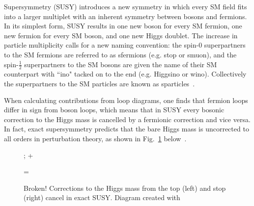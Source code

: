 \documentclass[12pt]{article}
\begin{document}
    Supersymmetry (SUSY) introduces a new symmetry in which every SM field fits into a larger multiplet with an inherent symmetry between bosons and fermions. In its simplest form, SUSY results in one new boson for every SM fermion, one new fermion for every SM boson, and one new Higgs doublet. The increase in particle multiplicity calls for a new naming convention: the spin-0 superpartners to the SM fermions are referred to as sfermions (e.g. stop or smuon), and the spin-$\frac{1}{2}$ superpartners to the SM bosons are given the name of their SM counterpart with ``ino" tacked on to the end (e.g. Higgsino or wino). Collectively the superpartners to the SM particles are known as sparticles~\cite{primer}.

    When calculating contributions from loop diagrams, one finds that fermion loops differ in sign from boson loops, which means that in SUSY every bosonic correction to the Higgs mass is cancelled by a fermionic correction and vice versa. In fact, exact supersymmetry predicts that the bare Higgs mass is uncorrected to all orders in perturbation theory, as shown in Fig.~\ref{exact_susy_correction} below~\cite{primer}.
    
    \noindent \begin{figure}[htbp] \begin{center}
        ;
    \quad + \quad
    \quad =  \quad
        \caption{Broken! Corrections to the Higgs mass from the top (left) and stop (right) cancel in exact SUSY. Diagram created with~\cite{tikz}}
    \label{exact_susy_correction}
    \end{center} \end{figure}
\end{document}
